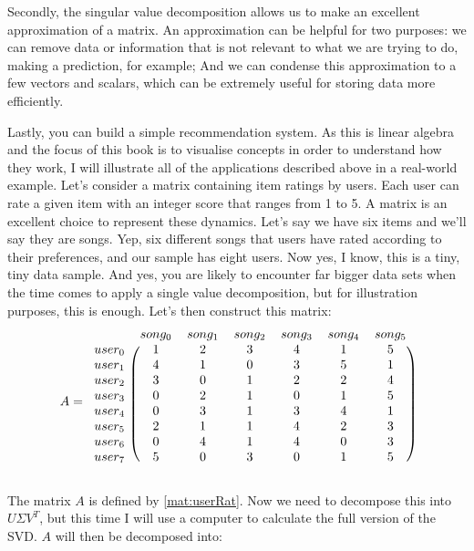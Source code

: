 \documentclass[a4,12pt,twosided,openany]{memoir}
\begin{document}
\par 
\indent
Secondly, the singular value decomposition allows us to make an excellent approximation of a matrix. An approximation can be helpful for two purposes: we can remove data or information that is not relevant to what we are trying to do, making a prediction, for example; And we can condense this approximation to a few vectors and scalars, which can be extremely useful for storing data more efficiently.
\par 
\indent
Lastly, you can build a simple recommendation system. As this is linear algebra and the focus of this book is to visualise concepts in order to understand how they work, I will illustrate all of the applications described above in a real-world example. Let’s consider a matrix containing item ratings by users. Each user can rate a given item with an integer score that ranges from 1 to 5. A matrix is an excellent choice to represent these dynamics. Let’s say we have six items and we’ll say they are songs. Yep, six different songs that users have rated according to their preferences, and our sample has eight users. Now yes, I know, this is a tiny, tiny data sample. And yes, you are likely to encounter far bigger data sets when the time comes to apply a single value decomposition, but for illustration purposes, this is enough. Let’s then construct this matrix:
\begin{equation}
A =
 \begin{blockarray}{cccccccc}
& song_0 & song_1 & song_2 & song_3 & song_4 & song_5\\
\begin{block}{c(ccccccc)}
user_0 & 1 & 2 & 3 & 4 & 1 & 5\\
user_1 & 4 & 1 & 0 & 3 & 5 & 1\\
user_2 & 3 & 0 & 1 & 2 & 2 & 4\\
user_3 & 0 & 2 & 1 & 0 & 1 & 5\\
user_4 & 0 & 3 & 1 & 3 & 4 & 1\\
user_5 & 2 & 1 & 1 & 4 & 2 & 3\\
user_6 & 0 & 4 & 1 & 4 & 0 & 3\\
user_7 & 5 & 0 & 3 & 0 & 1 & 5\\
\end{block}
\end{blockarray} \label{mat:userRat}
\end{equation}
\par 
\indent
The matrix $A$ is defined by \ref{mat:userRat}. Now we need to decompose this into $U \Sigma V^T$, but this time I will use a computer to calculate the full version of the SVD. $A$ will then be decomposed into:
\end{document}
